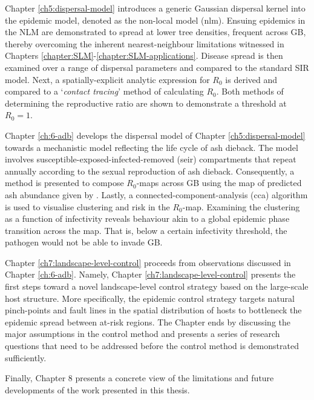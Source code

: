Chapter \ref{ch5:dispersal-model} introduces a generic Gaussian dispersal kernel into the epidemic model, denoted as the non-local model (\acrshort{nlm}). Ensuing epidemics in the NLM are demonstrated to spread at lower tree densities, frequent across GB, thereby overcoming the inherent nearest-neighbour limitations witnessed in Chapters \ref{chapter:SLM}-\ref{chapter:SLM-applications}. Disease spread is then examined over a range of dispersal parameters and compared to the standard SIR model. Next, a spatially-explicit analytic expression for $R_0$ is derived and compared to a `\textit{contact tracing}' method of calculating $R_0$. Both methods of determining the reproductive ratio are shown to demonstrate a threshold at $R_0=1$.

Chapter \ref{ch:6-adb} develops the dispersal model of Chapter \ref{ch5:dispersal-model} towards a mechanistic model reflecting the life cycle of ash dieback. The model involves susceptible-exposed-infected-removed (\acrshort{seir}) compartments that repeat annually according to the sexual reproduction of ash dieback. Consequently, a method is presented to compose $R_0$-maps
across GB using the map of predicted ash abundance given by \cite{hill.data}. Lastly, a connected-component-analysis
(\acrshort{cca}) algorithm is used to visualise  clustering and risk in the $R_0$-map. Examining the clustering as a function
of infectivity reveals behaviour akin to a global epidemic phase transition across the map. That is, below a certain infectivity threshold, 
the pathogen would not be able to invade GB.

Chapter \ref{ch7:landscape-level-control} proceeds from observations discussed in Chapter \ref{ch:6-adb}. 
Namely, Chapter \ref{ch7:landscape-level-control} presents the first steps toward a novel landscape-level
control strategy based on the large-scale host structure. More specifically, the epidemic control strategy targets
natural pinch-points and fault lines in the spatial distribution of hosts to bottleneck the epidemic
spread between at-risk regions. The Chapter ends by discussing the major assumptions in the control method and presents
a series of research questions that need to be addressed before the control method is demonstrated sufficiently.

Finally, Chapter 8 presents a concrete view of the limitations and future developments of the work presented in this thesis.
